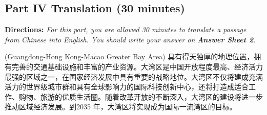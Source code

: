 \documentclass[UTF8,11pt]{ctexart}
\begin{document}
\subsection*{\textbf{Part IV Translation} \textbf{(30 minutes)}}


\textbf{Directions: }\textit{For this part, you are allowed 30 minutes to translate a passage from Chinese into English. You should} \textit{write your answer on }\textbf{\textit{Answer Sheet 2}}\textit{.}


(Guangdong-Hong Kong-Macao Greater Bay Area) 具有得天独厚的地理位置，拥有完善的交通基础设施和丰富的产业资源。大湾区是中国开放程度最高、经济活力最强的区域之一，在国家经济发展中具有重要的战略地位。大湾区不仅将建成充满活力的世界级城市群和具有全球影响力的国际科技创新中心，还将打造成适合工作、购物、旅游的优质生活圈。随着改革开放的不断深入，大湾区的建设将进一步推动区域经济发展。到2035 年，大湾区将实现成为国际一流湾区的目标。
\end{document}
